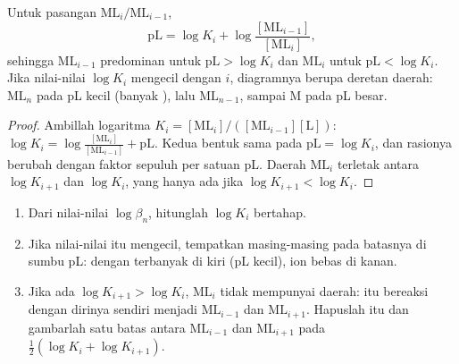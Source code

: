 \begin{proposition}\label{prop:b1:complexation:pl-boundaries}
Untuk pasangan $\mathrm{ML}_i/\mathrm{ML}_{i-1}$,
\[
  \mathrm{pL} = \log K_i + \log\frac{[\mathrm{ML}_{i-1}]}{[\mathrm{ML}_i]} ,
\]
sehingga $\mathrm{ML}_{i-1}$ predominan untuk $\mathrm{pL} > \log K_i$ dan
$\mathrm{ML}_i$ untuk $\mathrm{pL} < \log K_i$. Jika nilai-nilai
$\log K_i$ mengecil dengan $i$, diagramnya berupa deretan daerah:
$\mathrm{ML}_n$ pada pL kecil (banyak ), lalu $\mathrm{ML}_{n-1}$,
sampai M pada pL besar.
\end{proposition}

\begin{proof}
Ambillah logaritma $K_i = [\mathrm{ML}_i]/([\mathrm{ML}_{i-1}][\mathrm{L}])$:
$\log K_i = \log\frac{[\mathrm{ML}_i]}{[\mathrm{ML}_{i-1}]} + \mathrm{pL}$.
Kedua bentuk sama pada $\mathrm{pL} = \log K_i$, dan rasionya berubah
dengan faktor sepuluh per satuan pL. Daerah $\mathrm{ML}_i$ terletak
antara $\log K_{i+1}$ dan $\log K_i$, yang hanya ada jika $\log K_{i+1} < \log
K_i$.
\end{proof}

\begin{method}\label{met:b1:complexation:pl-diagram}
\begin{enumerate}
  \item Dari nilai-nilai $\log\beta_n$, hitunglah $\log K_i$ bertahap.
  \item Jika nilai-nilai itu mengecil, tempatkan masing-masing pada
        batasnya di sumbu pL:  dengan  terbanyak di kiri (pL
        kecil), ion bebas di kanan.
  \item Jika ada $\log K_{i+1} > \log K_i$,  $\mathrm{ML}_i$ tidak
        mempunyai daerah:  itu bereaksi dengan dirinya sendiri
        menjadi $\mathrm{ML}_{i-1}$ dan $\mathrm{ML}_{i+1}$. Hapuslah
         itu dan gambarlah satu batas antara $\mathrm{ML}_{i-1}$
        dan $\mathrm{ML}_{i+1}$ pada
        $\frac12(\log K_i + \log K_{i+1})$.
\end{enumerate}
\end{method}

